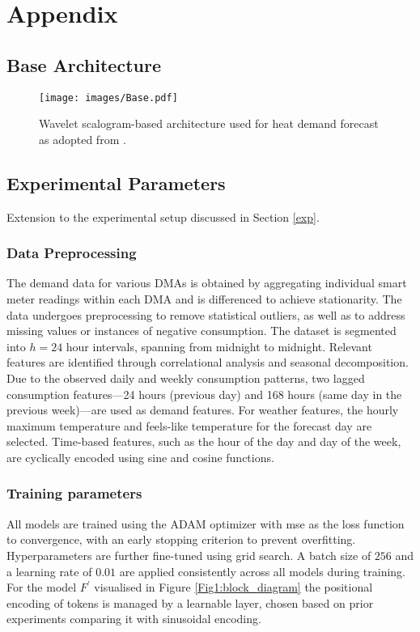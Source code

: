 \section{Appendix}

\subsection{Base Architecture}
\begin{figure}[htbp]
\centering
\texttt{[image: images/Base.pdf]}
\caption{Wavelet scalogram-based architecture used for heat demand forecast as adopted from \cite{chatterjee2022heat}.}
\label{Fig6_1:originialarch}
\end{figure}

\subsection{Experimental Parameters} \label{exps}
Extension to the experimental setup discussed in Section \ref{exp}.
\subsubsection{Data Preprocessing}
The demand data for various DMAs is obtained by aggregating individual smart meter readings within each DMA and is differenced to achieve stationarity. The data undergoes preprocessing to remove statistical outliers, as well as to address missing values or instances of negative consumption. The dataset is segmented into $h = 24$ hour intervals, spanning from midnight to midnight. Relevant features are identified through correlational analysis and seasonal decomposition. Due to the observed daily and weekly consumption patterns, two lagged consumption features—24 hours (previous day) and 168 hours (same day in the previous week)—are used as demand features. For weather features, the hourly maximum temperature and feels-like temperature for the forecast day are selected. Time-based features, such as the hour of the day and day of the week, are cyclically encoded using sine and cosine functions.

\subsubsection{Training parameters}
All models are trained using the ADAM optimizer with \acrshort{mse} as the loss function to convergence, with an early stopping criterion to prevent overfitting. Hyperparameters are further fine-tuned using grid search. A batch size of $256$ and a learning rate of $0.01$ are applied consistently across all models during training. For the model $F^{'}$ visualised in Figure \ref{Fig1:block_diagram} the positional encoding of tokens is managed by a learnable layer, chosen based on prior experiments comparing it with sinusoidal encoding.

